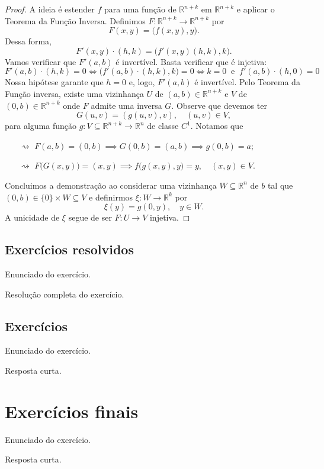 \begin{proof}
	A ideia é estender $f$ para uma função de $\mathbb{R}^{n+k}$ em $\mathbb{R}^{n+k}$ e aplicar o Teorema da Função Inversa. Definimos $F: \mathbb{R}^{n+k} \to \mathbb{R}^{n+k}$ por
	\[
	F(x,y) = \big( f(x,y), y \big).
	\] Dessa forma,
	\[
	F'(x,y) \cdot (h,k) = \big( f'(x,y) (h,k), k \big).
	\] Vamos verificar que $F'(a,b)$ é invertível. Basta verificar que é injetiva:
	\[
	F'(a,b) \cdot (h,k) = 0 \iff \big( f'(a,b) \cdot (h,k), k \big) = 0 \iff k = 0 \ \text{ e } \ f'(a,b) \cdot (h,0) = 0
	\] Nossa hipótese garante que $h=0$ e, logo, $F'(a,b)$ é invertível. Pelo Teorema da Função inversa, existe uma vizinhança $U$ de $(a,b) \in \mathbb{R}^{n+k}$ e $V$ de $(0,b) \in \mathbb{R}^{n+k}$ onde $F$ admite uma inversa $G$. Observe que devemos ter
	\[
	G(u,v) = (g(u,v), v), \quad (u,v) \in V,
	\] para alguma função $g: V \subseteq \mathbb{R}^{n+k} \to \mathbb{R}^{n}$ de classe $C^1$. Notamos que
	\begin{itemize}
		\item[$\rightsquigarrow$] $F(a,b) = (0,b) \implies G(0,b) = (a,b) \implies g(0,b) = a;$
		
		\item[$\rightsquigarrow$] $F \big( G(x,y) \big) = (x,y) \implies f\big( g(x,y), y \big) = y, \quad (x,y) \in V.$
	\end{itemize} Concluimos a demonstração ao considerar uma vizinhança $W \subseteq \mathbb{R}^n$ de $b$ tal que $(0,b) \in \{0\} \times W \subseteq V$ e definirmos $\xi: W \to \mathbb{R}^k$ por
	\[
	\xi (y) = g (0,y), \quad y \in W.
	\] A unicidade de $\xi$ segue de ser $F: U \to V$ injetiva.
\end{proof}





\subsection*{Exercícios resolvidos}

\construirExeresol

\begin{exeresol}
  Enunciado do exercício.
\end{exeresol}
\begin{resol}
  Resolução completa do exercício.
\end{resol}

\subsection*{Exercícios}

\construirExer

\begin{exer}
  Enunciado do exercício.
\end{exer}
\begin{resp}
  Resposta curta.
\end{resp}

\section{Exercícios finais}

\construirExer

\begin{exer}
  Enunciado do exercício.
\end{exer}
\begin{resp}
  Resposta curta.
\end{resp}

